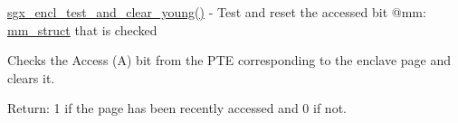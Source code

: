 \mbox{\hyperlink{encl_8c_a58a2b7ac02337bef2ea40e523729a040}{sgx\+\_\+encl\+\_\+test\+\_\+and\+\_\+clear\+\_\+young()}} -\/ Test and reset the accessed bit @mm\+: \mbox{\hyperlink{structmm__struct}{mm\+\_\+struct}} that is checked

Checks the Access (A) bit from the P\+TE corresponding to the enclave page and clears it.

Return\+: 1 if the page has been recently accessed and 0 if not. 